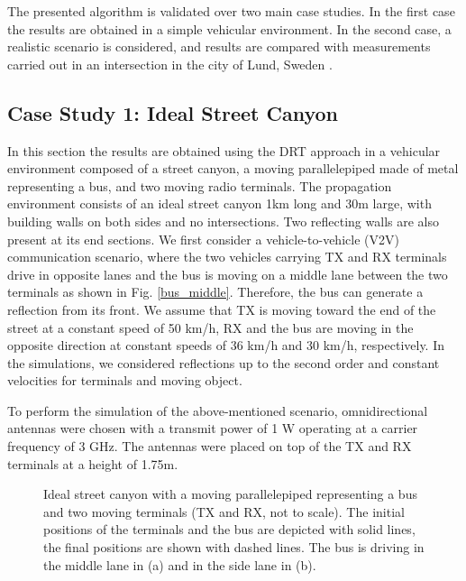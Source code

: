The presented algorithm is validated over two main case studies. In the first case the results are obtained in a simple vehicular environment. In the second case, a realistic scenario is considered, and results are compared with measurements carried out in an intersection in the city of Lund, Sweden \cite{abbas}. 
\subsection{Case Study 1: Ideal Street Canyon}

In this section the results are obtained using the DRT approach in a vehicular environment composed of a street canyon, a moving parallelepiped made of metal representing a bus, and two moving radio terminals. The propagation environment consists of an ideal street canyon 1km long and 30m large, with building walls on both sides and no intersections. Two reflecting walls are also present at its end sections. 
We first consider a vehicle-to-vehicle (V2V) communication scenario, where the two vehicles carrying TX and RX terminals drive in opposite lanes and the bus is moving on a middle lane between the two terminals as shown in Fig. \ref{bus_middle}. Therefore, the bus can generate a reflection from its front. We assume that TX is moving toward the end of the street at a constant speed of 50 km/h, RX and the bus are moving in the opposite direction at constant speeds of 36 km/h and 30 km/h, respectively. In the simulations, we considered reflections up to the second order and constant velocities for terminals and moving object. \par
To perform the simulation of the above-mentioned scenario, omnidirectional antennas were chosen with a transmit power of 1 W operating at a carrier frequency of 3 GHz. The antennas were placed on top of the TX and RX terminals at a height of 1.75m.  

\begin{figure}
    \captionsetup[subfigure]{font=scriptsize,labelfont=scriptsize}
    \centering
    \quad
    \caption{Ideal street canyon with a moving parallelepiped representing a bus and two moving terminals (TX and RX, not to scale).  The initial positions of the terminals and the bus are depicted with solid lines,  the final positions are shown with dashed lines. The bus is driving in the middle lane in (a) and in the side lane in (b).}
    \label{street_canyon}
\end{figure}

